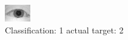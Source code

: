 \begin{figure}[h!]
\begin{center}
\includegraphics[width=0.60\columnwidth]{figures/ID1012_class_1_target_2.png}
\end{center}
\caption{ Classification: 1 actual target: 2}
\label{fig:ID1012_class_1_target_2}
\end{figure}

